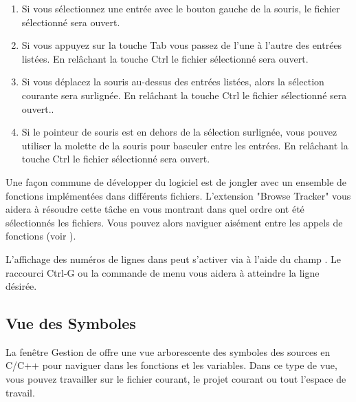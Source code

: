 \begin{enumerate}
\item Si vous sélectionnez une entrée avec le bouton gauche de la souris, le fichier sélectionné sera ouvert.
\item Si vous appuyez sur la touche Tab vous passez de l'une à l'autre des entrées listées. En relâchant la touche Ctrl le fichier sélectionné sera ouvert.
\item Si vous déplacez la souris au-dessus des entrées listées, alors la sélection courante sera surlignée. En relâchant la touche Ctrl le fichier sélectionné sera ouvert..
\item Si le pointeur de souris est en dehors de la sélection surlignée, vous pouvez utiliser la molette de la souris pour basculer entre les entrées. En relâchant la touche Ctrl le fichier sélectionné sera ouvert.
\end{enumerate}

Une façon commune de développer du logiciel est de jongler avec un ensemble de fonctions implémentées dans différents fichiers. L'extension "Browse Tracker" vous aidera à résoudre cette tâche en vous montrant dans quel ordre ont été sélectionnés les fichiers. Vous pouvez alors naviguer aisément entre les appels de fonctions (voir ).

L'affichage des numéros de lignes dans \codeblocks peut s'activer via  à l'aide du champ . Le raccourci Ctrl-G ou la commande de menu  vous aidera à atteindre la ligne désirée.


\subsection{Vue des Symboles}

La fenêtre Gestion de \codeblocks offre une vue arborescente des symboles des sources en C/C++ pour naviguer dans les fonctions et les variables. Dans ce type de vue, vous pouvez travailler sur le fichier courant, le projet courant ou tout l'espace de travail.


